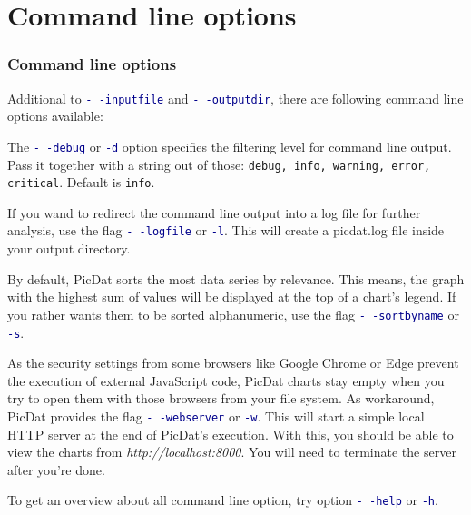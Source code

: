 \documentclass[8pt]{beamer}
\begin{document}
\section{Command line options}
\begin{frame}
\frametitle{Command line options}
Additional to \textcolor{darkblue}{\texttt{-\,-inputfile}} and \textcolor{darkblue}{\texttt{-\,-outputdir}}, there are following command line options available:
\bigskip

The \textcolor{darkblue}{\texttt{-\,-debug}} or \textcolor{darkblue}{\texttt{-d}} option specifies the filtering level for command line output. Pass it together with a string out of those: \texttt{debug, info, warning, error, critical}. Default is \texttt{info}.
\bigskip

If you wand to redirect the command line output into a log file for further analysis, use the flag \textcolor{darkblue}{\texttt{-\,-logfile}} or \textcolor{darkblue}{\texttt{-l}}. This will create a picdat.log file inside your output directory.
\bigskip

By default, PicDat sorts the most data series by relevance. This means, the graph with the highest sum of values will be displayed at the top of a chart's legend. If you rather wants them to be sorted alphanumeric, use the flag \textcolor{darkblue}{\texttt{-\,-sortbyname}} or \textcolor{darkblue}{\texttt{-s}}.
\bigskip

As the security settings from some browsers like Google Chrome or Edge prevent the execution of external JavaScript code, PicDat charts stay empty when you try to open them with those browsers from your file system. As workaround, PicDat provides the flag \textcolor{darkblue}{\texttt{-\,-webserver}} or \textcolor{darkblue}{\texttt{-w}}. This will start a simple local HTTP server at the end of PicDat's execution. With this, you should be able to view the charts from \textit{http://localhost:8000}. You will need to terminate the server after you're done.
\bigskip

To get an overview about all command line option, try option \textcolor{darkblue}{\texttt{-\,-help}} or \textcolor{darkblue}{\texttt{-h}}.
\end{frame}
\end{document}
